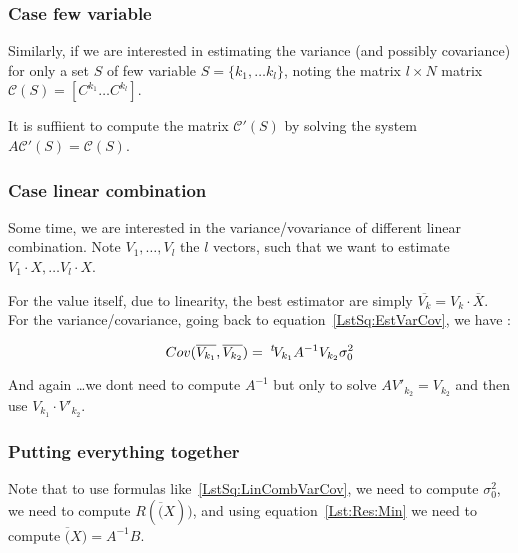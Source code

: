 \subsubsection{Case few variable}

Similarly, if we are interested in estimating the variance (and possibly covariance)  for
only a set $S$ of  few variable $S=\{k_1,\dots k_l\}$, noting the matrix $l \times N$
matrix $\mathcal{C}(S) = [C^{k_1} \dots C^{k_l}]$.

It is suffiient to compute the  matrix $ \mathcal{C}'(S)$ by
solving  the system $A \mathcal{C}'(S) = \mathcal{C}(S)$.

\subsubsection{Case linear combination}

Some time, we are interested in the variance/vovariance  of  different linear combination.
Note $V_1, \dots ,V_l$ the $l$ vectors, such that  we want to estimate $V_1 \cdot X, \dots V_l \cdot X$.

For the value itself, due to linearity, the best estimator are simply $\overline{V_k} = V_k \cdot \overline X$.
For the variance/covariance, going back to equation~\ref{LstSq:EstVarCov}, we have :


\begin{equation}
	Cov(\overline{V_{k_1}},\overline{V_{k_2}})  =  \; ^{t} \! V_{k_1} A^{-1} V_{k_2}  \sigma_0^2 \label{LstSq:LinCombVarCov}
\end{equation}

And again \dots we dont need to compute $ A^{-1}$ but only to solve $A V'_{k_2}  = V_{k_2}$ and then use $V_{k_1} \cdot V'_{k_2}$.

\subsubsection{Putting everything together}

\label{LstSq:Uncer:AllTog}

Note that to use formulas like~\ref{LstSq:LinCombVarCov}, we need to compute $\sigma_0^2$,  we need to compute $R(\overline(X))$,
and using equation~\ref{Lst:Res:Min}  we need to compute  $ \overline(X) =  A^{-1} B$.

